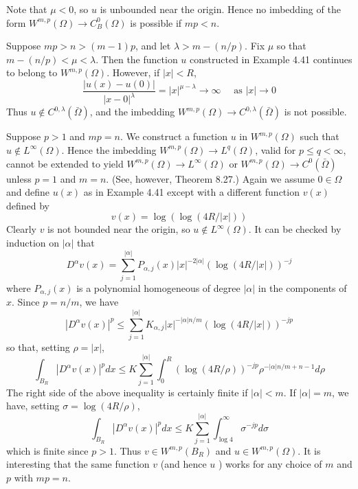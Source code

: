 Note that $\mu<0$, so $u$ is unbounded near the origin. Hence no imbedding of the form $W^{m, p}(\Omega) \rightarrow C_B^0(\Omega)$ is possible if $m p<n$.


\begin{example}
  Suppose $m p>n>(m-1) p$, and let $\lambda>m-(n / p)$. Fix $\mu$ so that $m-(n / p)<\mu<\lambda$. Then the function $u$ constructed in Example 4.41 continues to belong to $W^{m, p}(\Omega)$. However, if $|x|<R$,
  \[
  \frac{|u(x)-u(0)|}{|x-0|^\lambda}=|x|^{\mu-\lambda} \rightarrow \infty \quad \text { as }|x| \rightarrow 0
  \]
  Thus $u \notin C^{0, \lambda}(\bar{\Omega})$, and the imbedding $W^{m, p}(\Omega) \rightarrow C^{0, \lambda}(\bar{\Omega})$ is not possible.
\end{example}

\begin{example}
  Suppose $p>1$ and $m p=n$. We construct a function $u$ in $W^{m, p}(\Omega)$ such that $u \notin L^{\infty}(\Omega)$. Hence the imbedding $W^{m, p}(\Omega) \rightarrow L^q(\Omega)$, valid for $p \leq q<\infty$, cannot be extended to yield $W^{m, p}(\Omega) \rightarrow L^{\infty}(\Omega)$ or $W^{m, p}(\Omega) \rightarrow C^0(\bar{\Omega})$ unless $p=1$ and $m=n$. (See, however, Theorem 8.27.)
  Again we assume $0 \in \Omega$ and define $u(x)$ as in Example 4.41 except with a different function $v(x)$ defined by
  \[
  v(x)=\log (\log (4 R /|x|))
  \]
  Clearly $v$ is not bounded near the origin, so $u \notin L^{\infty}(\Omega)$. It can be checked by induction on $|\alpha|$ that
  \[
  D^\alpha v(x)=\sum_{j=1}^{|\alpha|} P_{\alpha, j}(x)|x|^{-2|\alpha|}(\log (4 R /|x|))^{-j}
  \]
  where $P_{\alpha, j}(x)$ is a polynomial homogeneous of degree $|\alpha|$ in the components of $x$. Since $p=n / m$, we have
  \[
  \left|D^\alpha v(x)\right|^p \leq \sum_{j=1}^{|\alpha|} K_{\alpha, j}|x|^{-|\alpha| n / m}(\log (4 R /|x|))^{-j p}
  \]
  so that, setting $\rho=|x|$,
  \[
  \int_{B_R}\left|D^\alpha v(x)\right|^p d x \leq K \sum_{j=1}^{|\alpha|} \int_0^R(\log (4 R / \rho))^{-j p} \rho^{-|\alpha| n / m+n-1} d \rho
  \]
  The right side of the above inequality is certainly finite if $|\alpha|<m$. If $|\alpha|=m$, we have, setting $\sigma=\log (4 R / \rho)$,
  \[
  \int_{B_R}\left|D^\alpha v(x)\right|^p d x \leq K \sum_{j=1}^{|\alpha|} \int_{\log 4}^{\infty} \sigma^{-j p} d \sigma
  \]
  which is finite since $p>1$. Thus $v \in W^{m, p}\left(B_R\right)$ and $u \in W^{m, p}(\Omega)$.
  It is interesting that the same function $v$ (and hence $u$ ) works for any choice of $m$ and $p$ with $m p=n$.
\end{example}


